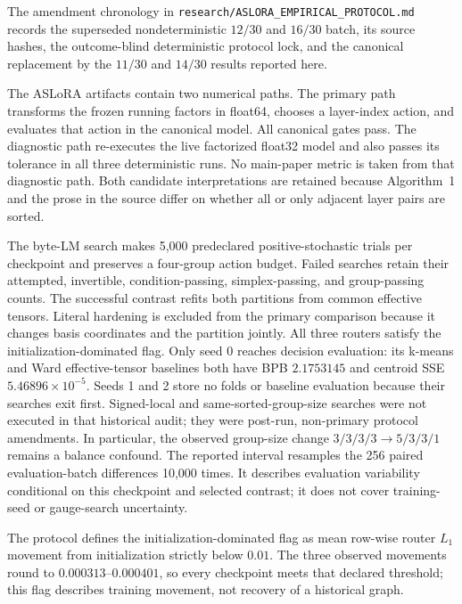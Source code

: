 The amendment chronology in
\texttt{research/ASLORA\_EMPIRICAL\_PROTOCOL.md} records the superseded
nondeterministic \(12/30\) and \(16/30\) batch, its source hashes, the
outcome-blind deterministic protocol lock, and the canonical replacement by
the \(11/30\) and \(14/30\) results reported here.

The ASLoRA artifacts contain two numerical paths. The primary path transforms the frozen running factors in float64, chooses a
layer-index action, and evaluates that action in the canonical model.  All
canonical gates pass.  The diagnostic path re-executes the live factorized
float32 model and also passes its tolerance in all three deterministic runs.
No main-paper metric is taken from that diagnostic path.  Both
candidate interpretations are retained because Algorithm~1 and the prose in
the source differ on whether all or only adjacent layer pairs are sorted.





The byte-LM search makes 5,000 predeclared positive-stochastic trials per
checkpoint and preserves a four-group action budget.  Failed searches retain
their attempted, invertible, condition-passing, simplex-passing, and
group-passing counts.  The successful contrast refits both partitions from
common effective tensors.  Literal hardening is excluded from the primary
comparison because it changes basis coordinates and the partition jointly.
All three routers satisfy the initialization-dominated flag.  Only seed 0
reaches decision evaluation: its k-means and Ward effective-tensor baselines
both have BPB $2.1753145$ and centroid SSE $5.46896\times10^{-5}$.  Seeds 1 and
2 store no folds or baseline evaluation because their searches exit first.
Signed-local and same-sorted-group-size searches were not executed in that
historical audit; they were
post-run, non-primary protocol amendments.  In particular, the observed
group-size change $3/3/3/3\to5/3/3/1$ remains a balance confound.
The reported interval resamples the 256 paired evaluation-batch differences
10,000 times. It describes evaluation variability conditional on this
checkpoint and selected contrast; it does not cover training-seed or
gauge-search uncertainty.

The protocol defines the initialization-dominated flag as mean row-wise router
$L_1$ movement from initialization strictly below $0.01$.  The three observed
movements round to $0.000313$--$0.000401$, so every checkpoint meets that
declared threshold; this flag describes training movement, not recovery of a
historical graph.


